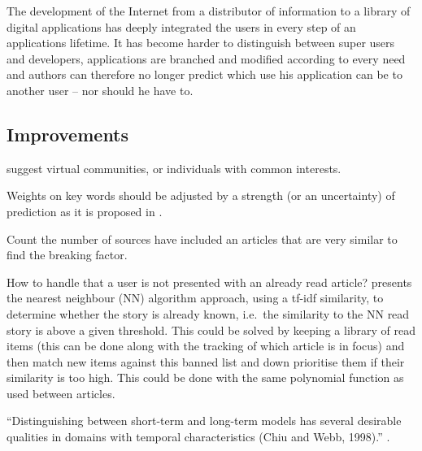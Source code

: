 The development of the Internet from a distributor of information to a library of digital applications has deeply integrated the users in every step of an applications lifetime. It has become harder to distinguish between super users and developers, applications are branched and modified according to every need and authors can therefore no longer predict which use his application can be to another user -- nor should he have to.

\subsection{Improvements}
\cite{Personalizing-your-electronic-newspaper.pdf} suggest virtual communities, or individuals with common interests.

Weights on key words should be adjusted by a strength (or an uncertainty) of prediction as it is proposed in \cite{10.1.1.45.5230.pdf}.

Count the number of sources have included an articles that are very similar to find the breaking factor.

How to handle that a user is not presented with an already read article? \cite{User-Modeling-for-Adaptive-News-Access.pdf} presents the nearest neighbour (NN) algorithm approach, using a tf-idf similarity, to determine whether the story is already known, i.e.\ the similarity to the NN read story is above a given threshold. This could be solved by keeping a library of read items (this can be done along with the tracking of which article is in focus) and then match new items against this banned list and down prioritise them if their similarity is too high. This could be done with the same polynomial function as used between articles.

``Distinguishing between short-term and long-term models has several desirable qualities in domains with temporal characteristics (Chiu and Webb, 1998).'' \cite{User-Modeling-for-Adaptive-News-Access.pdf}.

